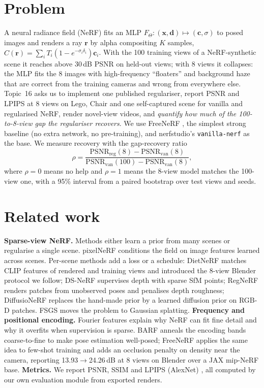 \section{Problem}
A neural radiance field (NeRF) \cite{mildenhall2020nerf} fits an MLP $F_\Theta:(\mathbf{x},\mathbf{d})\mapsto(\mathbf{c},\sigma)$ to posed images and renders a ray $\mathbf{r}$ by alpha compositing $K$ samples, $\hat{C}(\mathbf{r})=\sum_i T_i(1-e^{-\sigma_i\delta_i})\mathbf{c}_i$. With the 100 training views of a NeRF-synthetic scene it reaches above 30\,dB PSNR on held-out views; with 8 views it collapses: the MLP fits the 8 images with high-frequency ``floaters'' and background haze that are correct from the training cameras and wrong from everywhere else. Topic~16 asks us to implement one published regulariser, report PSNR and LPIPS at 8 views on Lego, Chair and one self-captured scene for vanilla and regularised NeRF, render novel-view videos, and \emph{quantify how much of the 100-to-8-view gap the regulariser recovers}. We use FreeNeRF \cite{yang2023freenerf}, the simplest strong baseline (no extra network, no pre-training), and nerfstudio's \texttt{vanilla-nerf} \cite{tancik2023nerfstudio} as the base. We measure recovery with the gap-recovery ratio
\begin{equation}
\rho=\frac{\mathrm{PSNR}_\text{reg}(8)-\mathrm{PSNR}_\text{van}(8)}{\mathrm{PSNR}_\text{van}(100)-\mathrm{PSNR}_\text{van}(8)},
\label{eq:rho}
\end{equation}
where $\rho=0$ means no help and $\rho=1$ means the 8-view model matches the 100-view one, with a 95\% interval from a paired bootstrap over test views and seeds.

\section{Related work}
\textbf{Sparse-view NeRF.} Methods either learn a prior from many scenes or regularise a single scene. pixelNeRF \cite{yu2021pixelnerf} conditions the field on image features learned across scenes. Per-scene methods add a loss or a schedule: DietNeRF \cite{jain2021dietnerf} matches CLIP features of rendered and training views and introduced the 8-view Blender protocol we follow; DS-NeRF \cite{deng2022dsnerf} supervises depth with sparse SfM points; RegNeRF \cite{niemeyer2022regnerf} renders patches from unobserved poses and penalises depth roughness; DiffusioNeRF \cite{wynn2023diffusionerf} replaces the hand-made prior by a learned diffusion prior on RGB-D patches. FSGS \cite{zhu2024fsgs} moves the problem to Gaussian splatting.
\textbf{Frequency and positional encoding.} Fourier features \cite{tancik2020fourier} explain why NeRF can fit fine detail and why it overfits when supervision is sparse. BARF \cite{lin2021barf} anneals the encoding bands coarse-to-fine to make pose estimation well-posed; FreeNeRF \cite{yang2023freenerf} applies the same idea to few-shot training and adds an occlusion penalty on density near the camera, reporting 13.93$\to$24.26\,dB at 8 views on Blender over a JAX mip-NeRF base.
\textbf{Metrics.} We report PSNR, SSIM \cite{wang2004ssim} and LPIPS (AlexNet) \cite{zhang2018lpips}, all computed by our own evaluation module from exported renders.
